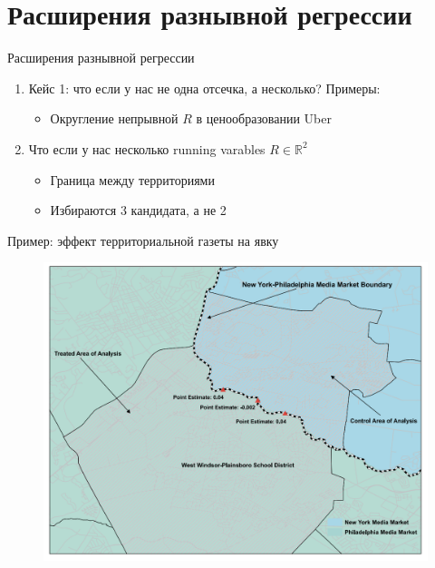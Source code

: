 
\section{Расширения разнывной регрессии}

\begin{frame}{Расширения разнывной регрессии }
\begin{enumerate}
    \item Кейс 1: что если у нас не одна отсечка, а несколько? Примеры:
    \begin{itemize}
        \item Округление непрывной $R$ в ценообразовании Uber
    \end{itemize}
    \item Что если у нас несколько running varables $R \in \mathbb{R}^2$
    \begin{itemize}
        \item Граница между территориями
        \item Избираются 3 кандидата, а не 2
    \end{itemize}
\end{enumerate}
    
\end{frame}

\begin{frame}{Пример: эффект территориальной газеты на явку \parencite{keele2015geographic}}
    \begin{figure}
        \centering
        \includegraphics[width=\textwidth]{Images/geo.png}
    \end{figure}
\end{frame}


